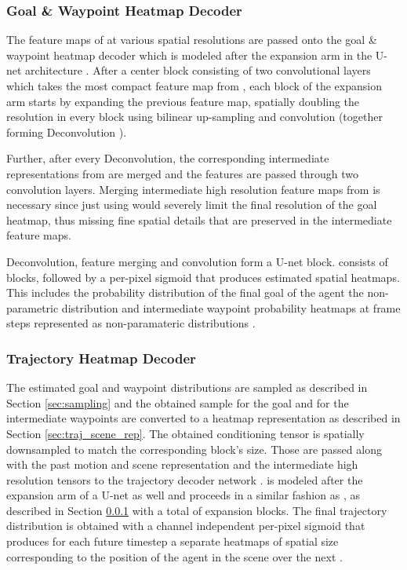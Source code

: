 \documentclass[final]{cvpr}
\begin{document}
\subsubsection{Goal \& Waypoint Heatmap Decoder}
\label{sec:goal_decoder}
The feature maps of  at various spatial resolutions are passed onto the goal \& waypoint heatmap decoder  which is modeled after the expansion arm in the U-net architecture \cite{unet}. After a center block consisting of two convolutional layers which takes the most compact feature map  from , each block of the expansion arm starts by expanding the previous feature map, spatially doubling the resolution in every block using bilinear up-sampling and convolution (together forming Deconvolution \cite{unet}). 

Further, after every Deconvolution, the corresponding intermediate representations from  are merged and the features are passed through two convolution layers.
Merging intermediate high resolution feature maps from  is necessary since just using  would severely limit the final resolution of the goal heatmap, thus missing fine spatial details that are preserved in the intermediate feature maps. 

Deconvolution, feature merging and convolution form a U-net block.  consists of  blocks, followed by a per-pixel sigmoid that produces  estimated spatial heatmaps. This includes the probability distribution of the final goal of the agent \ie the non-parametric distribution  and  intermediate waypoint probability heatmaps at frame steps  represented as non-paramateric distributions .

\subsubsection{Trajectory Heatmap Decoder}
\label{sec:traj_decoder}
The estimated goal and waypoint distributions are sampled as described in Section \ref{sec:sampling} and the obtained sample  for the goal and  for the intermediate waypoints are converted to a heatmap representation as described in Section \ref{sec:traj_scene_rep}. The obtained conditioning tensor  is spatially downsampled to match the corresponding block's size. Those are passed along with the past motion and scene representation  and the  intermediate high resolution tensors to the trajectory decoder network .  is modeled after the expansion arm of a U-net as well and proceeds in a similar fashion as , as described in Section \ref{sec:goal_decoder} with a total of  expansion blocks. The final trajectory distribution is obtained with a channel independent per-pixel sigmoid that produces for each future timestep a separate heatmaps of spatial size  corresponding to the position of the agent in the scene over the next .
\end{document}
